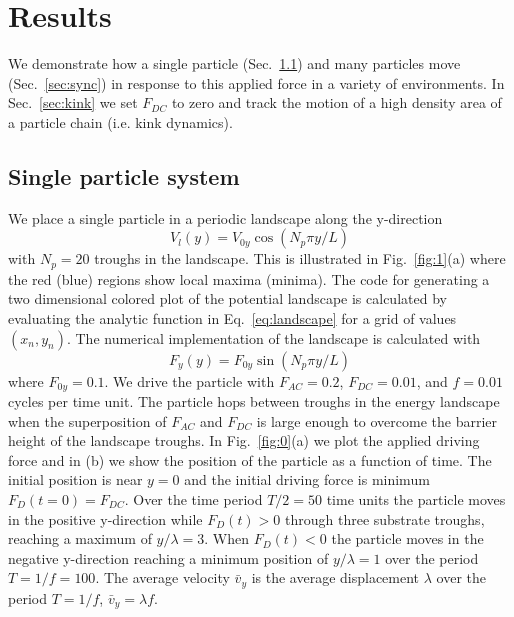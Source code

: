 \documentclass[prb,preprint]{revtex4}
\begin{document}
\section{Results}
\label{sec:results}
 We demonstrate how a single particle (Sec.~\ref{sec:one})
 and many particles
 move (Sec.~\ref{sec:sync})
 in response to this applied force in a variety of environments.
 In Sec.~\ref{sec:kink} we set $F_{DC}$
 to zero and track the motion
 of a high density area of a particle chain
 (i.e. kink dynamics).
%
\subsection{Single particle system}
\label{sec:one}

We place a single particle in a periodic landscape 
along the y-direction 
\begin{equation}
  \label{eq:landscape}
  V_l(y) = V_{0y} \cos{(N_p \pi y / L)} 
\end{equation}
with $N_p=20$ troughs in the landscape.
This is illustrated in Fig.~\ref{fig:1}(a) where
the red (blue) regions show local maxima (minima).
The code for generating
a two dimensional colored plot
of the potential landscape
is calculated by evaluating
the analytic function in Eq.~\ref{eq:landscape}
for a grid of values $(x_n,y_n)$.
The numerical implementation of the landscape 
is calculated with
\begin{equation}
  \label{eq:landscape}
  F_y(y) = F_{0y} \sin{(N_p \pi y / L)} 
\end{equation}
where $F_{0y} = 0.1$.
We drive the particle with
$F_{AC}=0.2$, $F_{DC}=0.01$, and $f=0.01$ cycles per time unit.
The particle hops between troughs in the energy landscape
when the superposition of $F_{AC}$ and $F_{DC}$ is large enough
to overcome the barrier height of the landscape troughs.
In Fig.~\ref{fig:0}(a)
we plot the applied driving force
and in (b) 
we show the position of the particle
as a function of time.
The initial position is near $y=0$
and the initial driving force is minimum
$F_D(t=0) = F_{DC}$.
Over the time period $T/2 = 50$ time units
the particle moves
in the positive y-direction
while $F_{D}(t) > 0 $
through three
substrate troughs, reaching a maximum of $y/\lambda = 3$.
When $F_{D}(t) < 0 $
the particle moves in the negative y-direction
reaching a minimum position
of $y/\lambda = 1$
over the period $T = 1/f = 100$.
The average velocity $\bar{v}_y$ is the average displacement $\lambda$ over the period $T = 1/f$, $\bar{v}_y = \lambda f$.
\end{document}
